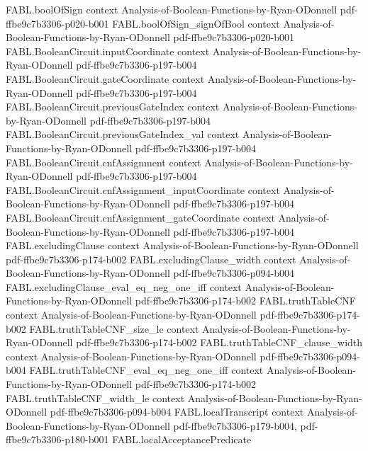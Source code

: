 \begin{theorem}
\proofstep
  {FABL.boolOfSign}
  {context}
  {Analysis-of-Boolean-Functions-by-Ryan-ODonnell}
  {pdf-ffbe9c7b3306-p020-b001}
\proofstep
  {FABL.boolOfSign_signOfBool}
  {context}
  {Analysis-of-Boolean-Functions-by-Ryan-ODonnell}
  {pdf-ffbe9c7b3306-p020-b001}
\proofstep
  {FABL.BooleanCircuit.inputCoordinate}
  {context}
  {Analysis-of-Boolean-Functions-by-Ryan-ODonnell}
  {pdf-ffbe9c7b3306-p197-b004}
\proofstep
  {FABL.BooleanCircuit.gateCoordinate}
  {context}
  {Analysis-of-Boolean-Functions-by-Ryan-ODonnell}
  {pdf-ffbe9c7b3306-p197-b004}
\proofstep
  {FABL.BooleanCircuit.previousGateIndex}
  {context}
  {Analysis-of-Boolean-Functions-by-Ryan-ODonnell}
  {pdf-ffbe9c7b3306-p197-b004}
\proofstep
  {FABL.BooleanCircuit.previousGateIndex_val}
  {context}
  {Analysis-of-Boolean-Functions-by-Ryan-ODonnell}
  {pdf-ffbe9c7b3306-p197-b004}
\proofstep
  {FABL.BooleanCircuit.cnfAssignment}
  {context}
  {Analysis-of-Boolean-Functions-by-Ryan-ODonnell}
  {pdf-ffbe9c7b3306-p197-b004}
\proofstep
  {FABL.BooleanCircuit.cnfAssignment_inputCoordinate}
  {context}
  {Analysis-of-Boolean-Functions-by-Ryan-ODonnell}
  {pdf-ffbe9c7b3306-p197-b004}
\proofstep
  {FABL.BooleanCircuit.cnfAssignment_gateCoordinate}
  {context}
  {Analysis-of-Boolean-Functions-by-Ryan-ODonnell}
  {pdf-ffbe9c7b3306-p197-b004}
\proofstep
  {FABL.excludingClause}
  {context}
  {Analysis-of-Boolean-Functions-by-Ryan-ODonnell}
  {pdf-ffbe9c7b3306-p174-b002}
\proofstep
  {FABL.excludingClause_width}
  {context}
  {Analysis-of-Boolean-Functions-by-Ryan-ODonnell}
  {pdf-ffbe9c7b3306-p094-b004}
\proofstep
  {FABL.excludingClause_eval_eq_neg_one_iff}
  {context}
  {Analysis-of-Boolean-Functions-by-Ryan-ODonnell}
  {pdf-ffbe9c7b3306-p174-b002}
\proofstep
  {FABL.truthTableCNF}
  {context}
  {Analysis-of-Boolean-Functions-by-Ryan-ODonnell}
  {pdf-ffbe9c7b3306-p174-b002}
\proofstep
  {FABL.truthTableCNF_size_le}
  {context}
  {Analysis-of-Boolean-Functions-by-Ryan-ODonnell}
  {pdf-ffbe9c7b3306-p174-b002}
\proofstep
  {FABL.truthTableCNF_clause_width}
  {context}
  {Analysis-of-Boolean-Functions-by-Ryan-ODonnell}
  {pdf-ffbe9c7b3306-p094-b004}
\proofstep
  {FABL.truthTableCNF_eval_eq_neg_one_iff}
  {context}
  {Analysis-of-Boolean-Functions-by-Ryan-ODonnell}
  {pdf-ffbe9c7b3306-p174-b002}
\proofstep
  {FABL.truthTableCNF_width_le}
  {context}
  {Analysis-of-Boolean-Functions-by-Ryan-ODonnell}
  {pdf-ffbe9c7b3306-p094-b004}
\proofstep
  {FABL.localTranscript}
  {context}
  {Analysis-of-Boolean-Functions-by-Ryan-ODonnell}
  {pdf-ffbe9c7b3306-p179-b004,
    pdf-ffbe9c7b3306-p180-b001}
\proofstep
  {FABL.localAcceptancePredicate}

\end{theorem}
